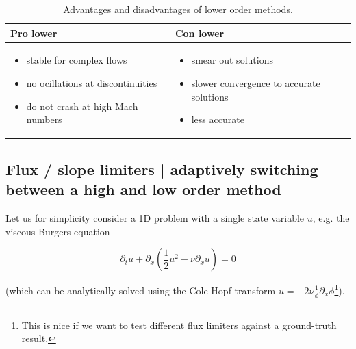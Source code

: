 \begin{table}[htb!]
    \centering
    \begin{tabular}{|p{}|p{}|}
        \hline
        \textcolor{green1}{Pro lower} & \textcolor{red1}{Con lower} \\
        \hline
        \begin{itemize}
            \item stable for complex flows
            \item no ocillations at discontinuities
            \item do not crash at high Mach numbers
        \end{itemize}
        &
        \begin{itemize}
            \item smear out solutions
            \item slower convergence to accurate solutions
            \item less accurate
        \end{itemize} \\
        \hline
    \end{tabular}
    \caption{Advantages and disadvantages of lower order methods.}
    \label{tab:low_order}
\end{table}

\subsection{Flux / slope limiters | adaptively switching between a high and low order method}

Let us for simplicity consider a 1D problem with a single state variable $u$, e.g.
the viscous Burgers equation

\begin{equation}
    \partial_t u + \partial_x \left( \frac{1}{2} u^2 - \nu \partial_x u \right) = 0
\end{equation}

(which can be analytically solved using the Cole-Hopf transform $u = - 2 \nu \frac{1}{\phi} \partial_x \phi$\footnote{This is nice if we want to test different flux limiters against a ground-truth result.}).


